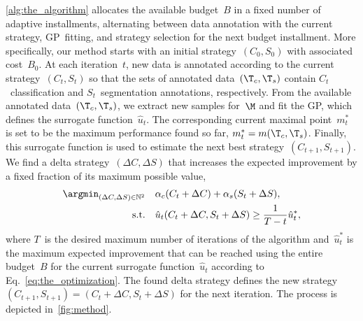 \cref{alg:the_algorithm} allocates the available budget~$B$ in a fixed number of adaptive installments, alternating between data annotation with the current strategy, GP~fitting, and strategy selection for the next budget installment. More specifically, our method starts with an initial strategy~$(C_0, S_0)$ with associated cost~$B_0$. At each iteration~$t$, new data is annotated according to the current strategy~$(C_t, S_t)$ so that the sets of annotated data~$(\T_c, \T_s)$ contain $C_t$~classification and $S_t$~segmentation annotations, respectively. From the available annotated data~$(\T_c, \T_s)$, we extract new samples for~$\M$ and fit the GP, which defines the surrogate function~$\hat{u}_t$. The corresponding current maximal point~$m^*_t$ is set to be the maximum performance found so far, $m^*_t=m(\T_c, \T_s)$. Finally, this surrogate function is used to estimate the next best strategy~$(C_{t+1}, S_{t+1})$. We find a delta strategy~$(\Delta{}C,\Delta{}S)$ that increases the expected improvement by a fixed fraction of its maximum possible value,
\begin{equation}
\begin{aligned}
    \argmin_{(\Delta{}C,\Delta{}S)\in\mathbb{N}^2} \quad & \alpha_c (C_t + \Delta{}C)+\alpha_s (S_t + \Delta{}S), \\
    \textrm{s.t.} \quad & \hat{u}_t(C_t + \Delta{}C, S_t + \Delta{}S) \ge \dfrac{1}{T - t}\hat{u}^*_t,
\end{aligned}
\label{eq:delta_strategy}
\end{equation}
where $T$~is the desired maximum number of iterations of the algorithm and~$\hat{u}_t^*$ is the maximum expected improvement that can be reached using the entire budget~$B$ for the current surrogate function~$\hat{u}_t$ according to Eq.~\eqref{eq:the_optimization}. The found delta strategy defines the new strategy~$(C_{t+1}, S_{t+1}) = (C_t + \Delta{}C, S_t + \Delta{}S)$ for the next iteration. The process is depicted in~\cref{fig:method}.

